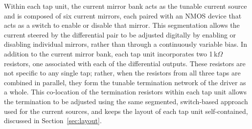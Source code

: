 Within each tap unit, the current mirror bank acts as the tunable current source and is composed of six current mirrors, each paired with an NMOS device that acts as a switch to enable or disable that mirror. This segmentation allows  the current steered by the differential pair to be adjusted digitally by enabling or disabling individual mirrors, rather than through a continuously variable bias. In addition to the current mirror bank, each tap unit incorporates two 1\,k$\Omega$ resistors, one associated with each of the differential outputs. These resistors are not specific to any single tap; rather, when the resistors from all three taps are combined in parallel, they form the tunable termination network of the driver as a whole. This co-location of the termination resistors within each tap unit allows the termination to be adjusted using the same segmented, switch-based approach used for the current sources, and keeps the layout of each tap unit self-contained, discussed in Section~\ref{sec:layout}.

